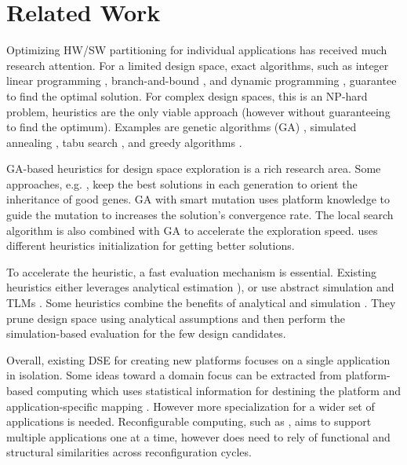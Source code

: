 \section{Related Work}
\label{sec:related}
Optimizing HW/SW partitioning for individual applications has received much research attention. For a limited design space, exact algorithms, such as integer linear programming \cite{kuang2005partitioning}, branch-and-bound \cite{jigang2004branch}, and dynamic programming \cite{wu2006low}, guarantee to find the optimal solution. For complex design spaces, this is an NP-hard problem, heuristics are the only viable approach (however without guaranteeing to find the optimum). Examples are genetic algorithms (GA) \cite{quan2014towards, alexandrescu2011genetic, wen2011heuristic, page2010multi}, simulated annealing \cite{liang2013hardware}, tabu search \cite{wu2013efficient}, and greedy algorithms \cite{tang2015hardware}. 

GA-based heuristics for design space exploration is a rich research area. Some approaches, e.g. \cite{quan2014towards}, keep the best solutions in each generation to orient the inheritance of good genes. GA with smart mutation \cite{alexandrescu2011genetic} uses platform knowledge to guide the mutation to increases the solution's convergence rate. The local search algorithm is also combined with GA \cite{wen2011heuristic} to accelerate the exploration speed. \cite{page2010multi} uses different heuristics initialization for getting better solutions. 
 
To accelerate the heuristic, a fast evaluation mechanism is essential. Existing heuristics either leverages analytical estimation \cite{pinedo2016scheduling, omara2010genetic}), or use abstract simulation and TLMs \cite{pimentel2006systematic, ghenassia2005transaction}. Some heuristics combine the benefits of analytical and simulation \cite{zhang2014automatic, mariani2010correlation}. They prune design space using analytical assumptions and then perform the simulation-based evaluation for the few design candidates.

Overall, existing DSE for creating new platforms focuses on a single application in isolation. Some ideas toward a domain focus can be extracted from platform-based computing which uses statistical information for destining the platform and application-specific mapping \cite{graf2014multi, gladigau2010system}. However more specialization for a wider set of applications is needed. Reconfigurable computing, such as  \cite{wildermann2011operational}, aims to support multiple applications one at a time, however does need to rely of functional and structural similarities across reconfiguration cycles. 

